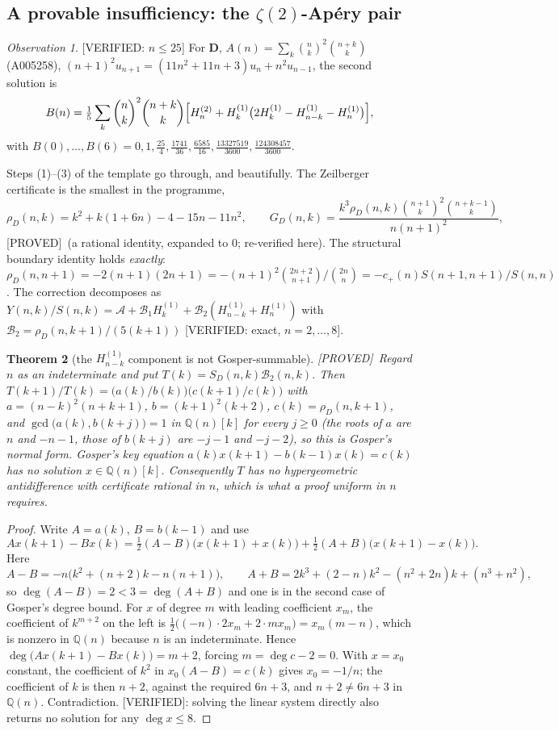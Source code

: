 \documentclass[11pt,reqno]{amsart}
\theoremstyle{plain}
\newtheorem{theorem}{Theorem}[section]
\theoremstyle{definition}
\theoremstyle{remark}
\newtheorem{observation}[theorem]{Observation}
\newcommand{\Q}{\mathbb{Q}}
\newcommand{\bin}[2]{\binom{#1}{#2}}
\newcommand{\HH}[2]{H^{(#1)}_{#2}}
\newcommand{\Proved}{\textup{\textsf{[PROVED]}}}
\newcommand{\Verified}{\textup{\textsf{[VERIFIED]}}}
\newcommand{\VerifiedR}[1]{\textup{\textsf{[VERIFIED: #1]}}}
\numberwithin{equation}{section}
\begin{document}
\subsection{A provable insufficiency: the $\zeta(2)$-Ap\'ery pair}\label{sec:Dobstruction}
\begin{observation}\label{obs:Dform}
\VerifiedR{$n\le25$} For $\mathbf D$, $A(n)=\sum_k\bin nk^2\bin{n+k}k$ (A005258),
$(n+1)^2u_{n+1}=(11n^2+11n+3)u_n+n^2u_{n-1}$, the second solution is
\[
  B(n)=\tfrac15\sum_k\bin nk^2\bin{n+k}k
        \Bigl[\HH2n+\HH1k\bigl(2\HH1k-\HH1{n-k}-\HH1n\bigr)\Bigr],
\]
with $B(0),\dots,B(6)=0,1,\tfrac{25}4,\tfrac{1741}{36},\tfrac{6585}{16},
\tfrac{13327519}{3600},\tfrac{124308457}{3600}$.
\end{observation}

Steps (1)--(3) of the template go through, and beautifully. The Zeilberger certificate is
the smallest in the programme,
\[
  \rho_D(n,k)=k^2+k(1+6n)-4-15n-11n^2,\qquad
  G_D(n,k)=\frac{k^3\rho_D(n,k)\bin{n+1}k^2\bin{n+k-1}k}{n(n+1)^2},
\]
\Proved\ (a rational identity, expanded to $0$; re-verified here). The structural boundary
identity holds \emph{exactly}:
$\rho_D(n,n+1)=-2(n+1)(2n+1)=-(n+1)^2\bin{2n+2}{n+1}\big/\bin{2n}n=-c_+(n)S(n+1,n+1)/S(n,n)$.
The correction decomposes as $Y(n,k)/S(n,k)=\mathcal A+\mathcal B_1\HH1k
+\mathcal B_2(\HH1{n-k}+\HH1n)$ with $\mathcal B_2=\rho_D(n,k+1)/(5(k+1))$
\VerifiedR{exact, $n=2,\dots,8$}.

\begin{theorem}[the $\HH1{n-k}$ component is not Gosper-summable]\label{thm:gosper}
\Proved\ Regard $n$ as an indeterminate and put $T(k)=S_D(n,k)\mathcal B_2(n,k)$. Then
$T(k+1)/T(k)=\bigl(a(k)/b(k)\bigr)\bigl(c(k+1)/c(k)\bigr)$ with
$a=(n-k)^2(n+k+1)$, $b=(k+1)^2(k+2)$, $c(k)=\rho_D(n,k+1)$, and
$\gcd\bigl(a(k),b(k+j)\bigr)=1$ in $\Q(n)[k]$ for every $j\ge0$ (the roots of $a$ are $n$
and $-n-1$, those of $b(k+j)$ are $-j-1$ and $-j-2$), so this is Gosper's normal form.
Gosper's key equation $a(k)x(k+1)-b(k-1)x(k)=c(k)$ has no solution $x\in\Q(n)[k]$.
Consequently $T$ has no hypergeometric antidifference with certificate rational in $n$,
which is what a proof uniform in $n$ requires.
\end{theorem}

\begin{proof}
Write $A=a(k)$, $B=b(k-1)$ and use
\[
  Ax(k+1)-Bx(k)=\tfrac12(A-B)\bigl(x(k+1)+x(k)\bigr)+\tfrac12(A+B)\bigl(x(k+1)-x(k)\bigr).
\]
Here
\[
  A-B=-n\bigl(k^2+(n+2)k-n(n+1)\bigr),\qquad
  A+B=2k^3+(2-n)k^2-(n^2+2n)k+(n^3+n^2),
\]
so $\deg(A-B)=2<3=\deg(A+B)$ and one is in the second case of Gosper's degree bound. For
$x$ of degree $m$ with leading coefficient $x_m$, the coefficient of $k^{m+2}$ on the left
is $\tfrac12\bigl((-n)\cdot2x_m+2\cdot mx_m\bigr)=x_m(m-n)$, which is nonzero in $\Q(n)$
because $n$ is an indeterminate. Hence $\deg\bigl(Ax(k+1)-Bx(k)\bigr)=m+2$, forcing
$m=\deg c-2=0$. With $x=x_0$ constant, the coefficient of $k^2$ in $x_0(A-B)=c(k)$ gives
$x_0=-1/n$; the coefficient of $k$ is then $n+2$, against the required $6n+3$, and
$n+2\ne6n+3$ in $\Q(n)$. Contradiction. \Verified: solving the linear system directly also
returns no solution for any $\deg x\le8$.
\end{proof}
\end{document}
